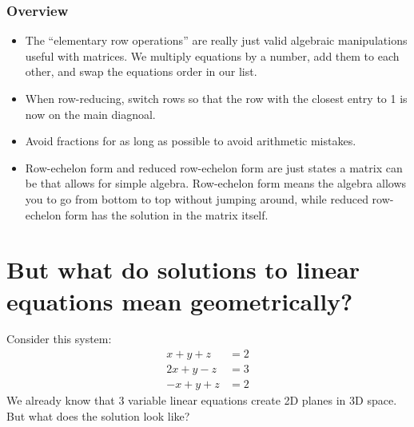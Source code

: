 \documentclass[12pt]{scrartcl}
\begin{document}
\newpage
\subsubsection*{Overview}
\begin{itemize}
    \item The ``elementary row operations'' are really just valid algebraic manipulations useful with matrices. We multiply equations by a number, add them to each other, and swap the equations order in our list.
    \item When row-reducing, switch rows so that the row with the closest entry to 1 is now on the main diagnoal.
    \item Avoid fractions for as long as possible to avoid arithmetic mistakes.
    \item Row-echelon form and reduced row-echelon form are just states a matrix can be that allows for simple algebra. Row-echelon form means the algebra allows you to go from bottom to top without jumping around, while reduced row-echelon form has the solution in the matrix itself.
\end{itemize}

\newpage
\section*{But what do solutions to linear equations mean geometrically?}
Consider this system:
\begin{align*}
    x + y + z &= 2 \\
    2x + y - z &= 3 \\
    -x + y + z &= 2
\end{align*}
We already know that 3 variable linear equations create 2D planes in 3D space. But what does the solution look like?
\end{document}

